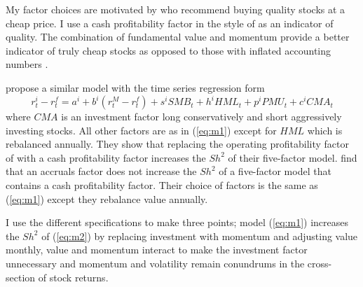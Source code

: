 My factor choices are motivated by \textcite{graham1934security} who recommend buying
quality stocks at a cheap price. I use a cash profitability factor in the style of
\textcite{ball2016accruals} as an indicator of quality. The combination of fundamental
value and momentum provide a better indicator of truly cheap stocks as opposed to those
with inflated accounting numbers \textcite{kok2017facts}.

\textcite{fama2016choosing} propose a similar model with the time series regression form
\begin{equation}
\label{eq:m2}
r_t^i-r_t^f=a^i+b^i\left( r_t^M-r_t^f\right) +s^iSMB_t+h^iHML_t+p^iPMU_t+c^iCMA_t
\end{equation}
where $CMA$ is an investment factor long conservatively and short aggressively investing
stocks. All other factors are as in (\ref{eq:m1}) except for $HML$ which is rebalanced
annually. They show that replacing the operating profitability factor of
\textcite{fama2015five} with a cash profitability factor increases the $Sh^2$ of their
five-factor model. \textcite{ball2016accruals} find that an accruals factor does not
increase the $Sh^2$ of a five-factor model that contains a cash profitability factor.
Their choice of factors is the same as (\ref{eq:m1}) except they rebalance value annually.

I use the different specifications to make three points; model (\ref{eq:m1}) increases the
$Sh^2$ of (\ref{eq:m2}) by replacing investment with momentum and adjusting value monthly,
value and momentum interact to make the investment factor unnecessary and momentum and
volatility remain conundrums in the cross-section of stock returns.

